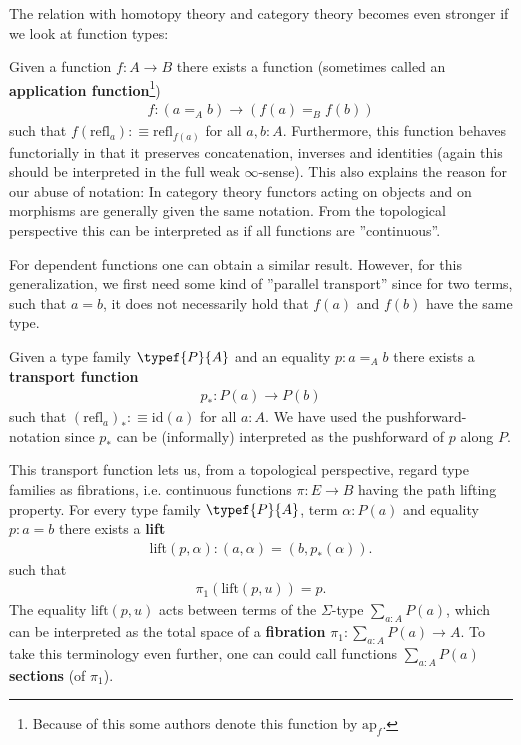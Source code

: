     The relation with homotopy theory and category theory becomes even stronger if we look at function types:
    \begin{property}
        Given a function $f:A\rightarrow B$ there exists a function (sometimes called an \textbf{application function}\footnote{Because of this some authors denote this function by $\text{ap}_f$.})
        \begin{gather}
            f:(a=_Ab)\rightarrow(f(a)=_Bf(b))
        \end{gather}
        such that $f(\text{refl}_a):\equiv\text{refl}_{f(a)}$ for all $a, b:A$. Furthermore, this function behaves functorially in that it preserves concatenation, inverses and identities (again this should be interpreted in the full weak $\infty$-sense). This also explains the reason for our abuse of notation: In category theory functors acting on objects and on morphisms are generally given the same notation. From the topological perspective this can be interpreted as if all functions are ''continuous''.
    \end{property}
    For dependent functions one can obtain a similar result. However, for this generalization, we first need some kind of ''parallel transport'' since for two terms, such that $a=b$, it does not necessarily hold that $f(a)$ and $f(b)$ have the same type.
    \begin{property}[Transport]
        Given a type family $\typef{P}{A}$ and an equality $p:a=_Ab$  there exists a \textbf{transport function}
        \begin{gather}
            p_*:P(a)\rightarrow P(b)
        \end{gather}
        such that $(\text{refl}_a)_*:\equiv\text{id}(a)$ for all $a:A$. We have used the pushforward-notation since $p_*$ can be (informally) interpreted as the pushforward of $p$ along $P$.

        This transport function lets us, from a topological perspective, regard type families as fibrations, i.e. continuous functions $\pi:E\rightarrow B$ having the path lifting property. For every type family $\typef{P}{A}$, term $\alpha:P(a)$ and equality $p:a=b$ there exists a \textbf{lift}
        \begin{gather}
            \text{lift}(p, \alpha):(a, \alpha) = (b, p_*(\alpha)).
        \end{gather}
        such that
        \begin{gather}
            \pi_1(\text{lift}(p, u))=p.
        \end{gather}
        The equality $\text{lift}(p, u)$ acts between terms of the $\Sigma$-type $\sum_{a:A}P(a)$, which can be interpreted as the total space of a \textbf{fibration} $\pi_1:\sum_{a:A}P(a)\rightarrow A$. To take this terminology even further, one can could call functions $\sum_{a:A}P(a)$ \textbf{sections} (of $\pi_1$).
    \end{property}
